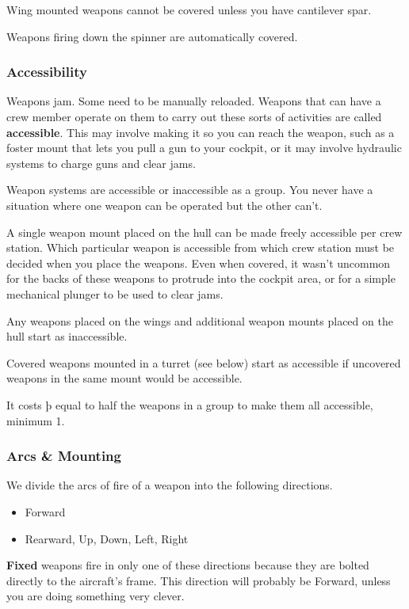 \documentclass{article}
\begin{document}
Wing mounted weapons cannot be covered unless you have cantilever
spar.

Weapons firing down the spinner are automatically covered.

\subsubsection{Accessibility}
\label{_Accessibility}

\hfill\break
Weapons jam. Some need to be manually reloaded. Weapons that can have a
crew member operate on them to carry out these sorts of activities are
called \textbf{accessible}. This may involve making it so you can reach
the weapon, such as a foster mount that lets you pull a gun to your
cockpit, or it may involve hydraulic systems to charge guns and clear
jams.

Weapon systems are accessible or inaccessible as a group. You never have
a situation where one weapon can be operated but the other can't.

A single weapon mount placed on the hull can be made freely accessible
per crew station. Which particular weapon is accessible from which crew
station must be decided when you place the weapons. Even when covered,
it wasn't uncommon for the backs of these weapons to protrude into the
cockpit area, or for a simple mechanical plunger to be used to clear
jams.

Any weapons placed on the wings and additional weapon mounts placed on
the hull start as inaccessible.

Covered weapons mounted in a turret (see below) start as accessible if
uncovered weapons in the same mount would be accessible.

It costs þ equal to half the weapons in a group to make them all
accessible, minimum 1.

\subsubsection{Arcs \& Mounting}
\label{_Arcs_\&_Mounting}

We divide the arcs of fire of a weapon into the following directions.

\begin{itemize}
    \item Forward
    \item Rearward, Up, Down, Left, Right
\end{itemize}

\textbf{Fixed}{ weapons fire in only one of these
    directions because they are bolted directly to the aircraft's frame.
    This direction will probably be Forward, unless you are doing something
    very clever.}
\end{document}
